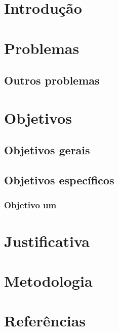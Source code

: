 \documentclass[12pt,nodisplayskipstretch]{article}
\begin{document}
\section{Introdução}
\lipsum[1]
\cite{Lorem}

\newpage

\section{Problemas}
\lipsum[1]

\subsection{Outros problemas}
\lipsum[1]

\section{Objetivos}
\lipsum[1]

\subsection{Objetivos gerais}
\lipsum[1]

\subsection{Objetivos específicos}
\subsubsection{Objetivo um}
\lipsum[1]

\section{Justificativa}
\lipsum[1]

\section{Metodologia}
\lipsum[1]

\newpage
\section{Referências}
\vspace{-20mm}

\end{document}
